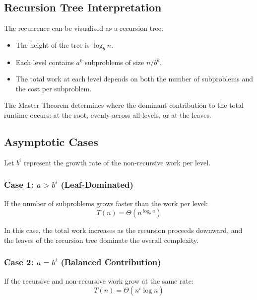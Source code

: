 \documentclass[12pt]{article}
\begin{document}
\vspace{0.2cm}

\subsection*{Recursion Tree Interpretation}

The recurrence can be visualised as a recursion tree:
\begin{itemize}[leftmargin=1.2cm]
	\item The height of the tree is $\log_b n$.
	\item Each level contains $a^k$ subproblems of size $n / b^k$.
	\item The total work at each level depends on both the number of subproblems
	      and the cost per subproblem.
\end{itemize}

The Master Theorem determines where the dominant contribution to the total runtime occurs: at the root, evenly across all levels, or at the leaves.

\vspace{0.2cm}

\subsection*{Asymptotic Cases}

Let $b^i$ represent the growth rate of the non-recursive work per level.

\subsubsection*{Case 1: $a > b^i$ (Leaf-Dominated)}

If the number of subproblems grows faster than the work per level:
\[
	T(n) = \Theta\!\left(n^{\log_b a}\right)
\]

In this case, the total work increases as the recursion proceeds downward,
and the leaves of the recursion tree dominate the overall complexity.

\vspace{0.15cm}

\subsubsection*{Case 2: $a = b^i$ (Balanced Contribution)}

If the recursive and non-recursive work grow at the same rate:
\[
	T(n) = \Theta(n^i \log n)
\]
\end{document}

